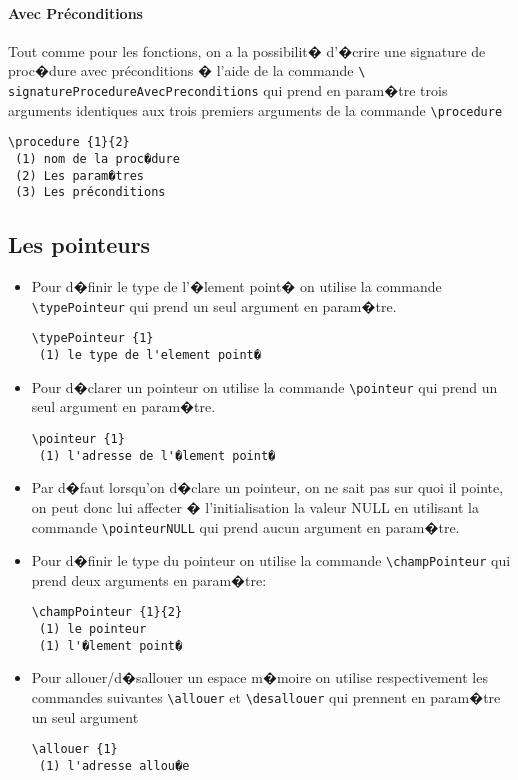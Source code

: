 \documentclass[a4paper,12pt]{report}
\begin{document}
{\paragraph{Avec Préconditions}
Tout comme pour les fonctions, on a la possibilit� d'�crire une
signature de proc�dure avec préconditions � l'aide de la commande \texttt{\textbackslash
  signatureProcedureAvecPreconditions} qui prend en param�tre trois arguments identiques
aux trois premiers arguments de la commande \texttt{\textbackslash  procedure}

\begin{lstlisting}
\procedure {1}{2}
 (1) nom de la proc�dure
 (2) Les param�tres
 (3) Les préconditions
\end{lstlisting}

 \subsection{Les pointeurs}
\begin{itemize}
\item Pour d�finir le type de l'�lement point� on utilise la commande \texttt{\textbackslash typePointeur} qui prend un seul argument en param�tre.
\begin{lstlisting}
\typePointeur {1}
 (1) le type de l'element point�
\end{lstlisting}
\item Pour d�clarer un pointeur on utilise la commande \texttt{\textbackslash pointeur} qui prend un seul argument en param�tre.
\begin{lstlisting}
\pointeur {1}
 (1) l'adresse de l'�lement point�
\end{lstlisting}
\item Par d�faut lorsqu'on d�clare un pointeur, on ne sait pas sur quoi il pointe, on peut donc lui affecter � l'initialisation la valeur NULL  en utilisant la commande \texttt{\textbackslash pointeurNULL}  qui prend aucun argument en param�tre.

\item Pour d�finir le type du pointeur on utilise la commande \texttt{\textbackslash champPointeur} qui prend deux arguments en param�tre:
\begin{lstlisting}
\champPointeur {1}{2}
 (1) le pointeur 
 (1) l'�lement point�
\end{lstlisting}
\item Pour allouer/d�sallouer un espace m�moire on utilise respectivement les commandes suivantes \texttt{\textbackslash allouer} et \texttt{\textbackslash desallouer} qui prennent en param�tre un seul argument
\begin{lstlisting}
\allouer {1}
 (1) l'adresse allou�e


\end{lstlisting}
\end{itemize}}
\end{document}
